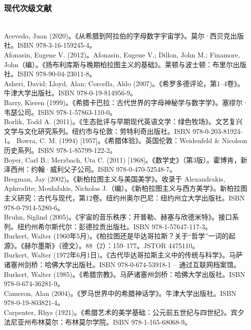 \subsubsection{现代次级文献}\\
Acevedo, Juan (2020)。《从希腊到阿拉伯的字母数字宇宙学》。莫尔·西贝克出版社。ISBN 978-3-16-159245-4。\\  
Afonasin, Eugene V. (2012)。Afonasin, Eugene V.; Dillon, John M.; Finamore, John（编）。《扬布利库斯与晚期柏拉图主义的基础》。莱顿与波士顿：布里尔出版社。ISBN 978-90-04-23011-8。\\  
Asheri, David; Lloyd, Alan; Corcella, Aldo (2007)。《希罗多德评论，第1–4卷》。牛津大学出版社。ISBN 978-0-19-814956-9。\\  
Barry, Kieren (1999)。《希腊卡巴拉：古代世界的字母神秘学与数字学》。塞缪尔·韦瑟公司。ISBN 978-1-57863-110-0。\\ 
Borlik, Todd A. (2011)。《生态批评与早期现代英语文学：绿色牧场》。文艺复兴文学与文化研究系列。纽约市与伦敦：劳特利奇出版社。ISBN 978-0-203-81924-1。  
Bowra, C. M. (1994) [1957]。《希腊体验》。英国伦敦：Weidenfeld & Nicolson 历史系列。ISBN 978-1-85799-122-2。\\  
Boyer, Carl B.; Merzbach, Uta C. (2011) [1968]。《数学史》（第3版）。霍博肯，新泽西州：约翰·威利父子公司。ISBN 978-0-470-52548-7。\\  
Bregman, Jay (2002)。《新柏拉图主义与美国美学》。收录于 Alexandrakis, Aphrodite; Moulafakis, Nicholas J.（编）。《新柏拉图主义与西方美学》。新柏拉图主义研究：古代与现代，第12卷。纽约州奥尔巴尼：纽约州立大学出版社。ISBN 978-0-7914-5280-6。\\  
Bruhn, Siglind (2005)。《宇宙的音乐秩序：开普勒、赫塞与欣德米特》。接口系列。纽约州希尔斯代尔：彭德拉贡出版社。ISBN 978-1-57647-117-3。\\ 
Burkert, Walter (1960年5月)。《柏拉图还是毕达哥拉斯？关于“哲学”一词的起源》。《赫尔墨斯》（德文）。88（2）：159–177。JSTOR 4475110。\\ 
Burkert, Walter (1972年6月1日)。《古代毕达哥拉斯主义中的传统与科学》。马萨诸塞州剑桥：哈佛大学出版社。ISBN 978-0-674-53918-1 – 通过互联网档案馆。  
Burkert, Walter (1985)。《希腊宗教》。马萨诸塞州剑桥：哈佛大学出版社。ISBN 978-0-674-36281-9。\\
Cameron, Alan (2004)。《罗马世界中的希腊神话学》。牛津大学出版社。ISBN 978-0-19-803821-4。\\  
Carpenter, Rhys (1921)。《希腊艺术的美学基础：公元前五世纪与四世纪》。宾夕法尼亚州布林莫尔：布林莫尔学院。ISBN 978-1-165-68068-9。\\  
